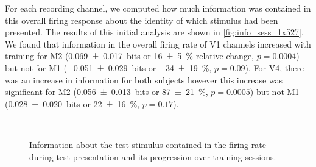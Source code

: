 For each recording channel, we computed how much information was contained in this overall firing response about the identity of which stimulus had been presented.
The results of this initial analysis are shown in \autoref{fig:info_sess_1x527}.
We found that information in the overall firing rate of \ac{V1} channels increased with training for \ac{M2} (\SI{+0.069\pm0.017}{bits} or \SI{+16\pm5}{\percent} relative change, $p=0.0004$) but not for \ac{M1} (\SI{-0.051\pm0.029}{bits} or \SI{-34\pm19}{\percent}, $p=0.09$).
For \ac{V4}, there was an increase in information for both subjects however this increase was significant for \ac{M2} (\SI{+0.056\pm0.013}{bits} or \SI{+87\pm21}{\percent}, $p=0.0005$) but not \ac{M1} (\SI{+0.028\pm0.020}{bits} or \SI{+22\pm16}{\percent}, $p=0.17$).


\begin{figure}[htbp]%
    \centering
    \hspace*{\fill}
    \hspace*{\fill}\hspace{.2cm}\hspace*{\fill}
    \hspace*{\fill}
    \\
    \hspace*{\fill}
    \hspace*{\fill}\hspace{.2cm}\hspace*{\fill}
    \hspace*{\fill}
    \caption{Information about the test stimulus contained in the firing rate during test presentation and its progression over training sessions.
}
\end{figure}
